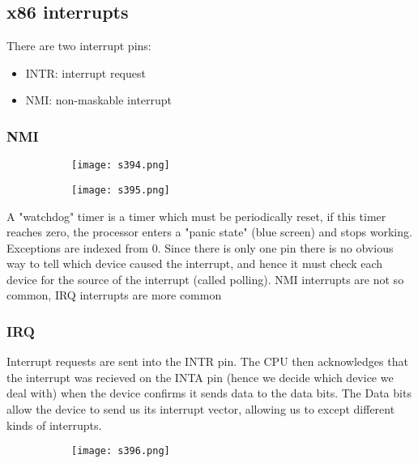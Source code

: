 \documentclass[8pt]{extreport}
\begin{document}
\subsection{x86 interrupts}

There are two interrupt pins:
\begin{itemize}
\item INTR: interrupt request
\item NMI: non-maskable interrupt
\end{itemize}

\subsubsection{NMI}
\begin{figure}[H]
\begin{subfigure}[b]{0.4\linewidth}
\texttt{[image: s394.png]}
\end{subfigure}
\begin{subfigure}[b]{0.4\linewidth}
\texttt{[image: s395.png]}
\end{subfigure}
\end{figure}
A "watchdog" timer is a timer which must be periodically reset, if this timer reaches zero, the processor enters a "panic state" (blue screen) and stops working. Exceptions are indexed from 0. Since there is only one pin there is no obvious way to tell which device caused the interrupt, and hence it must check each device for the source of the interrupt (called polling). NMI interrupts are not so common, IRQ interrupts are more common

\subsubsection{IRQ}

Interrupt requests are sent into the INTR pin. The CPU then acknowledges that the interrupt was recieved on the INTA pin (hence we decide which device we deal with) when the device confirms it sends data to the data bits. The Data bits allow the device to send us its interrupt vector, allowing us to except different kinds of interrupts.
\begin{figure}[H]
\begin{subfigure}[b]{0.4\linewidth}
\texttt{[image: s396.png]}
\end{subfigure}
\end{figure}
\end{document}
